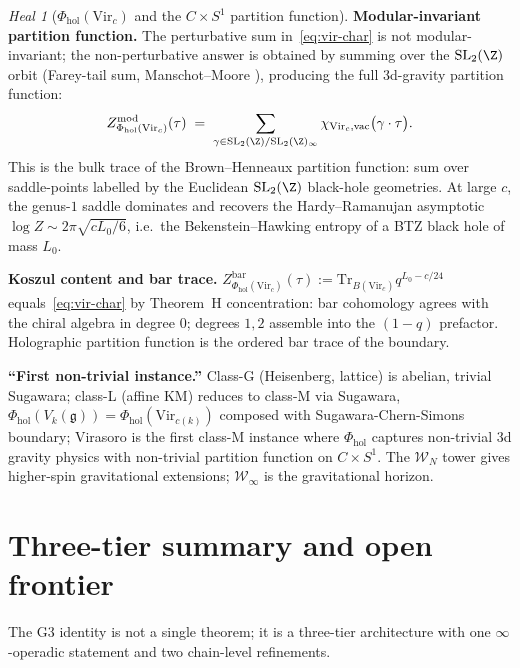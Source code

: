 \documentclass{article}
\theoremstyle{definition}
\theoremstyle{remark}
\newtheorem{heal}[theorem]{Heal}
\newcommand{\Phihol}{\Phi_{\mathrm{hol}}}
\newcommand{\fg}{\mathfrak{g}}
\newcommand{\Vir}{\mathrm{Vir}}
\newcommand{\cW}{\mathcal{W}}
\begin{document}
\begin{heal}[$\Phihol(\Vir_c)$ and the $C\times S^1$ partition
function]
\textbf{Modular-invariant partition function.} The perturbative sum
in~\eqref{eq:vir-char} is not modular-invariant; the non-perturbative
answer is obtained by summing over the $\mathrm{SL}_2(\Z)$ orbit
(Farey-tail sum, Manschot--Moore \cite{ManschotMoore}), producing
the full 3d-gravity partition function:
\begin{equation}\label{eq:vir-mod-inv}
 Z^{\mathrm{mod}}_{\Phihol(\Vir_c)}(\tau)
 \;=\; \sum_{\gamma \in
 \mathrm{SL}_2(\Z)/\mathrm{SL}_2(\Z)_{\infty}}
 \chi_{\Vir_c, \mathrm{vac}}\bigl(\gamma\cdot\tau\bigr).
\end{equation}
This is the bulk trace of the Brown--Henneaux partition function:
sum over saddle-points labelled by the Euclidean $\mathrm{SL}_2(\Z)$
black-hole geometries. At large $c$, the genus-$1$ saddle dominates
and recovers the Hardy--Ramanujan asymptotic
$\log Z \sim 2\pi\sqrt{cL_0/6}$, i.e.\ the Bekenstein--Hawking
entropy of a BTZ black hole of mass $L_0$.

\textbf{Koszul content and bar trace.}
$Z^{\mathrm{bar}}_{\Phihol(\Vir_c)}(\tau) := \mathrm{Tr}_{B(\Vir_c)}
q^{L_0 - c/24}$ equals~\eqref{eq:vir-char} by Theorem~H concentration:
bar cohomology agrees with the chiral algebra in degree $0$; degrees
$1, 2$ assemble into the $(1-q)$ prefactor. Holographic partition
function is the ordered bar trace of the boundary.

\textbf{``First non-trivial instance.''} Class-G (Heisenberg,
lattice) is abelian, trivial Sugawara; class-L (affine KM) reduces to
class-M via Sugawara, $\Phihol(V_k(\fg)) = \Phihol(\Vir_{c(k)})$
composed with Sugawara-Chern-Simons boundary; Virasoro is the first
class-M instance where $\Phihol$ captures non-trivial 3d gravity
physics with non-trivial partition function on $C\times S^1$. The
$\cW_N$ tower gives higher-spin gravitational extensions;
$\cW_\infty$ is the gravitational horizon.
\end{heal}

\section{Three-tier summary and open frontier}
\label{sec:summary}

The G3 identity is not a single theorem; it is a three-tier
architecture with one $\infty$-operadic statement and two chain-level
refinements.
\end{document}
